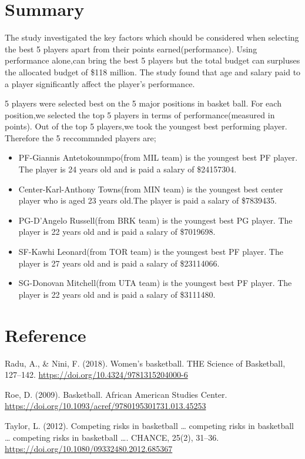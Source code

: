 \documentclass[
]{article}
\providecommand{\tightlist}{%
  \setlength{\itemsep}{0pt}\setlength{\parskip}{0pt}}
\begin{document}
\hypertarget{summary}{%
\section{Summary}\label{summary}}

The study investigated the key factors which should be considered when
selecting the best 5 players apart from their points
earned(performance). Using performance alone,can bring the best 5
players but the total budget can surpluses the allocated budget of \$118
million. The study found that age and salary paid to a player
significantly affect the player's performance.

5 players were selected best on the 5 major positions in basket ball.
For each position,we selected the top 5 players in terms of
performance(measured in points). Out of the top 5 players,we took the
youngest best performing player. Therefore the 5 reccommnded players
are;

\begin{itemize}
\tightlist
\item
  PF-Giannis Antetokounmpo(from MIL team) is the youngest best PF
  player. The player is 24 years old and is paid a salary of \$24157304.
\item
  Center-Karl-Anthony Towns(from MIN team) is the youngest best center
  player who is aged 23 years old.The player is paid a salary of
  \$7839435.
\item
  PG-D'Angelo Russell(from BRK team) is the youngest best PG player. The
  player is 22 years old and is paid a salary of \$7019698.
\item
  SF-Kawhi Leonard(from TOR team) is the youngest best PF player. The
  player is 27 years old and is paid a salary of \$23114066.
\item
  SG-Donovan Mitchell(from UTA team) is the youngest best PF player. The
  player is 22 years old and is paid a salary of \$3111480.
\end{itemize}

\hypertarget{reference}{%
\section{Reference}\label{reference}}

Radu, A., \& Nini, F. (2018). Women's basketball. THE Science of
Basketball, 127--142. \url{https://doi.org/10.4324/9781315204000-6}

Roe, D. (2009). Basketball. African American Studies Center.
\url{https://doi.org/10.1093/acref/9780195301731.013.45253}

Taylor, L. (2012). Competing risks in basketball \ldots{} competing
risks in basketball \ldots{} competing risks in basketball \ldots.
CHANCE, 25(2), 31--36.
\url{https://doi.org/10.1080/09332480.2012.685367}
\end{document}
